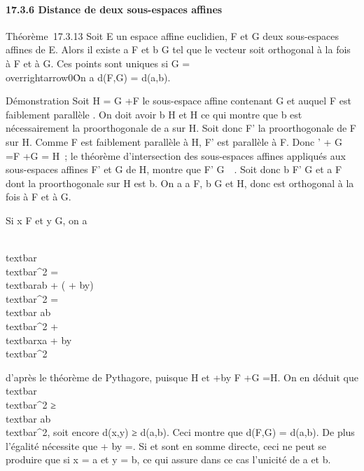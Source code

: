 \documentclass[]{article}
\begin{document}
\paragraph{17.3.6 Distance de deux sous-espaces affines}

Théorème~17.3.13 Soit E un espace affine euclidien, F et G deux
sous-espaces affines de E. Alors il existe a \in F et b \in G tel que le
vecteur \overrightarrowab soit orthogonal à la fois à
F et à G. Ces points sont uniques si \overrightarrowF
\bigcap\overrightarrow G =
\\overrightarrow0\.
On a d(F,G) = d(a,b).

Démonstration Soit H = G +\overrightarrow F le
sous-espace affine contenant G et auquel F est faiblement parallèle . On
doit avoir b \in H et \overrightarrowab \bot H ce qui
montre que b est nécessairement la pro\jmathection orthogonale de a sur H.
Soit donc F' la pro\jmathection orthogonale de F sur H. Comme F est
faiblement parallèle à H, F' est parallèle à F. Donc
\overrightarrowF' +\overrightarrow
G =\overrightarrow F
+\overrightarrow G =\overrightarrow
H~; le théorème d'intersection des sous-espaces affines appliqués aux
sous-espaces affines F' et G de H, montre que F' \bigcap
G\neq~\varnothing~. Soit donc b \in F' \bigcap G et a \in F dont la
pro\jmathection orthogonale sur H est b. On a a \in F, b \in G et
\overrightarrowab \bot H, donc
\overrightarrowab est orthogonal à la fois à F et à
G.

Si x \in F et y \in G, on a

\\textbar{}\overrightarrowxy\\textbar{}^2
=\\textbar{}\overrightarrow ab +
(\overrightarrowxa
+\overrightarrow
by)\\textbar{}^2
=\\textbar{}\overrightarrow
ab\\textbar{}^2
+\\textbar{}\overrightarrow xa
+\overrightarrow
by\\textbar{}^2

d'après le théorème de Pythagore, puisque
\overrightarrowab \bot\overrightarrow
H et \overrightarrowxa
+\overrightarrow by \in\overrightarrow
F +\overrightarrow G
=\overrightarrow H. On en déduit que
\\textbar{}\overrightarrowxy\\textbar{}^2
≥\\textbar{}\overrightarrow
ab\\textbar{}^2, soit encore d(x,y) ≥ d(a,b).
Ceci montre que d(F,G) = d(a,b). De plus l'égalité nécessite que
\overrightarrowxa +\overrightarrow
by =. Si
\overrightarrowF et
\overrightarrowG sont en somme directe, ceci ne peut
se produire que si x = a et y = b, ce qui assure dans ce cas l'unicité
de a et b.
\end{document}
